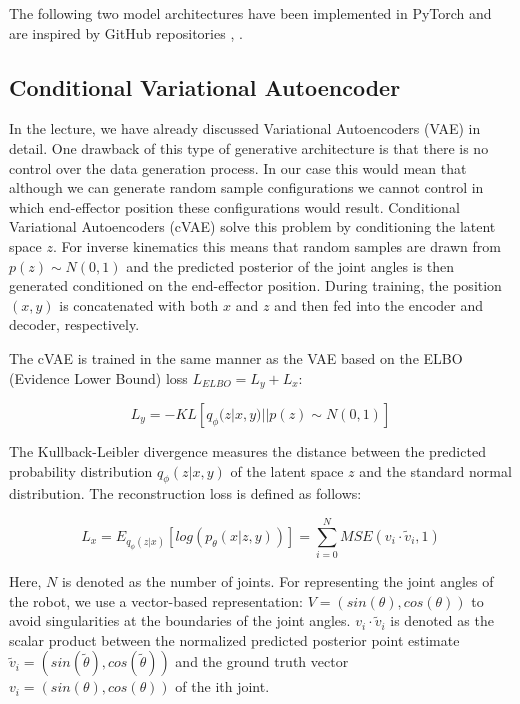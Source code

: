 \documentclass[conference]{IEEEtran}
\begin{document}
The following two model architectures have been implemented in PyTorch and are inspired by GitHub repositories \cite{graviraja2019}, \cite{freia2020}.

\subsection*{Conditional Variational Autoencoder}

In the lecture, we have already discussed Variational Autoencoders (VAE) \cite{Kingma2014} in detail. One drawback of this type of generative architecture is that there is no control over the data generation process. In our case this would mean that although we can generate random sample configurations we cannot control in which end-effector position these configurations would result. Conditional Variational Autoencoders (cVAE) \cite{Sohn2015} solve this problem by conditioning the latent space $z$. For inverse kinematics this means that random samples are drawn from $p(z) \sim N(0, 1)$ and the predicted posterior of the joint angles is then generated conditioned on the end-effector position. During training, the position $(x, y)$ is concatenated with both $x$ and $z$ and then fed into the encoder and decoder, respectively.

The cVAE is trained in the same manner as the VAE based on the ELBO (Evidence Lower Bound) loss $L_{ELBO} = L_y + L_x$:

\begin{equation}
    L_y = - KL[q_\phi(z | x, y) || p(z) \sim N(0, 1) ]
    \label{ELBO}
\end{equation}

The Kullback-Leibler divergence measures the distance between the predicted probability distribution $q_\phi(z | x, y)$ of the latent space $z$ and the standard normal distribution. The reconstruction loss is defined as follows:

\begin{equation}
    L_x = E_{q_\phi(z | x)}[log(p_\theta(x| z, y))] = \sum _ {i=0} ^ N MSE(v_i \cdot \tilde v_i, 1)
    \label{MSE}
\end{equation}

Here, $N$ is denoted as the  number of joints. For representing the joint angles of the robot, we use a vector-based representation: $V = (sin(\theta), cos(\theta))$ to avoid singularities at the boundaries of the joint angles. $v_i \cdot \tilde v_i$ is denoted as the scalar product between the normalized predicted posterior point estimate  $\tilde v_i  = (sin(\tilde \theta), cos(\tilde \theta))$ and the ground truth vector  $v_i = (sin(\theta), cos(\theta))$ of the ith joint.
\end{document}
